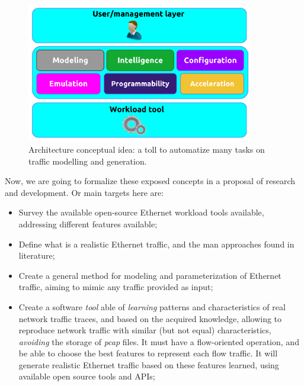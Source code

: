 \begin{figure}[ht!]
        \centering
        \includegraphics[height=2.4in]{figures/ch1/layer-diagram}
        \caption{ Architecture conceptual idea: a toll to automatize many tasks on traffic modelling and generation.}
    \label{fig:layer-diagram}
\end{figure}

Now, we are going to formalize these exposed concepts in a proposal of research and development. Or main targets here are:

\begin{itemize}

\item Survey the available open-source Ethernet workload tools available, addressing different features available;

\item Define what is a realistic Ethernet traffic, and the man approaches found in literature;

\item Create a general method for modeling and parameterization of Ethernet traffic, aiming to mimic any traffic provided as input;

\item Create a software \textit{tool} able of \textit{learning} patterns and characteristics of real network traffic traces, and based on the acquired knowledge, allowing to reproduce network traffic with similar (but not equal) characteristics, \textit{avoiding} the storage of \textit{pcap} files. It must have a flow-oriented operation, and be able to choose the best features to represent each flow traffic. It will generate realistic Ethernet traffic based on these features learned, using available open source tools and APIs;


\end{itemize}

